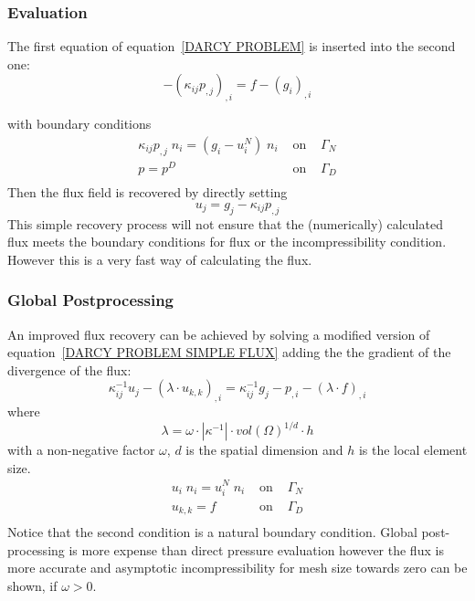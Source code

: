 \subsubsection{Evaluation}\label{SEC DARCY SIMPLE}
The first equation of equation~\ref{DARCY PROBLEM} is inserted into the second one:
\begin{equation}\label{DARCY PROBLEM SIMPLE}
- (\kappa_{ij} p_{,j})_{,i}  =  f  - (g_{i})_{,i}
\end{equation} 

with boundary conditions
\begin{equation}\label{DARCY BOUNDARY SIMPLE}
\begin{array}{rcl}
\kappa_{ij} p_{,j} \; n_{i}  = ( g_{i} - u^{N}_{i} )  \; n_{i} & \mbox{ on } & \Gamma_{N} \\
p = p^{D} &  \mbox{ on } & \Gamma_{D} \\ 
\end{array}
\end{equation} 
Then the flux field is recovered by directly setting
\begin{equation}\label{DARCY PROBLEM SIMPLE FLUX}
 u_{j} = g_j -  \kappa_{ij} p_{,j}  
\end{equation} 
This simple recovery process will not ensure that the (numerically) calculated flux
meets the boundary conditions for flux or the incompressibility condition. 
However this is a very fast way of calculating the flux.


\subsubsection{Global Postprocessing \label{SEC DARCY POST}}
An improved flux recovery can be achieved by solving a modified version of equation~\ref{DARCY PROBLEM SIMPLE FLUX}
adding the the gradient of the divergence of the flux:
\begin{equation}\label{DARCY PROBLEM POST FLUX}
\kappa^{-1}_{ij} u_{j} - 
(\lambda \cdot u_{k,k} )_{,i}= 
\kappa^{-1}_{ij} g_j- p_{,i} 
- (\lambda \cdot f )_{,i} 
\end{equation} 
where
\begin{equation}\label{DARCY PROBLEM POST FLUX A}
\lambda = \omega \cdot |\kappa^{-1}| \cdot vol(\Omega)^{1/d} \cdot h 
\end{equation} 
with a non-negative factor $\omega$, $d$ is the spatial dimension and $h$ is the local element size.
\begin{equation}\label{DARCY PROBLEM POST FLUX BOUNDARY}
\begin{array}{rcl}
u_{i} \; n_{i}  = u^{N}_{i}  \; n_{i} & \mbox{ on } & \Gamma_{N} \\
u_{k,k} = f & \mbox{ on } & \Gamma_{D} \\ 
\end{array}
\end{equation}   
Notice that the second condition is a natural boundary condition.
Global post-processing is more expense than direct pressure evaluation
however the flux is more accurate and asymptotic incompressibility
for mesh size towards zero can be shown, if $\omega>0$.


